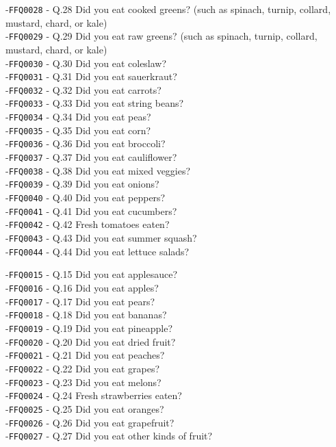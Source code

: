 \documentclass[
]{article}
\begin{document}
-\texttt{FFQ0028} - Q.28 Did you eat cooked greens? (such as spinach,
turnip, collard, mustard, chard, or kale)\\
-\texttt{FFQ0029} - Q.29 Did you eat raw greens? (such as spinach,
turnip, collard, mustard, chard, or kale)\\
-\texttt{FFQ0030} - Q.30 Did you eat coleslaw?\\
-\texttt{FFQ0031} - Q.31 Did you eat sauerkraut?\\
-\texttt{FFQ0032} - Q.32 Did you eat carrots?\\
-\texttt{FFQ0033} - Q.33 Did you eat string beans?\\
-\texttt{FFQ0034} - Q.34 Did you eat peas?\\
-\texttt{FFQ0035} - Q.35 Did you eat corn?\\
-\texttt{FFQ0036} - Q.36 Did you eat broccoli?\\
-\texttt{FFQ0037} - Q.37 Did you eat cauliflower?\\
-\texttt{FFQ0038} - Q.38 Did you eat mixed veggies?\\
-\texttt{FFQ0039} - Q.39 Did you eat onions?\\
-\texttt{FFQ0040} - Q.40 Did you eat peppers?\\
-\texttt{FFQ0041} - Q.41 Did you eat cucumbers?\\
-\texttt{FFQ0042} - Q.42 Fresh tomatoes eaten?\\
-\texttt{FFQ0043} - Q.43 Did you eat summer squash?\\
-\texttt{FFQ0044} - Q.44 Did you eat lettuce salads?

-\texttt{FFQ0015} - Q.15 Did you eat applesauce?\\
-\texttt{FFQ0016} - Q.16 Did you eat apples?\\
-\texttt{FFQ0017} - Q.17 Did you eat pears?\\
-\texttt{FFQ0018} - Q.18 Did you eat bananas?\\
-\texttt{FFQ0019} - Q.19 Did you eat pineapple?\\
-\texttt{FFQ0020} - Q.20 Did you eat dried fruit?\\
-\texttt{FFQ0021} - Q.21 Did you eat peaches?\\
-\texttt{FFQ0022} - Q.22 Did you eat grapes?\\
-\texttt{FFQ0023} - Q.23 Did you eat melons?\\
-\texttt{FFQ0024} - Q.24 Fresh strawberries eaten?\\
-\texttt{FFQ0025} - Q.25 Did you eat oranges?\\
-\texttt{FFQ0026} - Q.26 Did you eat grapefruit?\\
-\texttt{FFQ0027} - Q.27 Did you eat other kinds of fruit?
\end{document}
